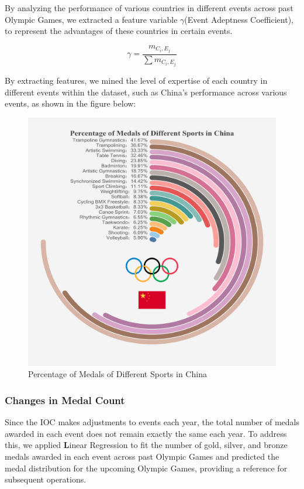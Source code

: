 \documentclass[12pt]{article}  %
\begin{document}
By analyzing the performance of various countries in different events across past Olympic Games, we extracted a feature variable $\gamma$(Event Adeptness Coefficient), to represent the advantages of these countries in certain events.

\begin{equation}
	\gamma = \frac{m_{C_i,E_j}}{\sum m_{C_i,E_j}}
\end{equation}





By extracting features, we mined the level of expertise of each country in different events within the dataset, such as China's performance across various events, as shown in the figure below:

\begin{figure}[H]
	\centering
	\includegraphics[width=12cm]{img/Percentage.jpg}
	\caption{Percentage of Medals of Different Sports in China}
	\label{fig:aa}
\end{figure}


\subsubsection{Changes in Medal Count}
Since the IOC makes adjustments to events each year, the total number of medals awarded in each event does not remain exactly the same each year. To address this, we applied \textbf Linear Regression to fit the number of gold, silver, and bronze medals awarded in each event across past Olympic Games and predicted the medal distribution for the upcoming Olympic Games, providing a reference for subsequent operations.
\end{document}
